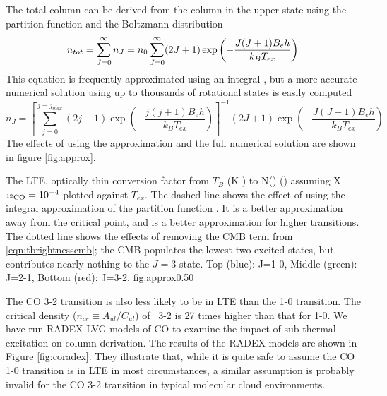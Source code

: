 The total column can be derived from the column in the upper state using the partition
function and the Boltzmann distribution
\begin{equation}
  n_{tot}  =        \sum_{J=0}^\infty n_J = n_0 \sum_{J=0}^\infty  (2J+1) \exp\left(-\frac{J(J+1) B_e h}{k_B T_{ex}}\right) \label{eqn:approxpartition}\\
\end{equation}
This equation is frequently approximated using an integral
\citep[e.g.][]{Cabrit1990}, but a more accurate numerical solution using up to
thousands of rotational states is easily computed
\begin{equation}
  n_J = \left[ \sum_{j=0}^{j=j_{max}} (2j+1) \exp\left(-\frac{j(j+1) B_e h}{k_B T_{ex}}\right) \right]^{-1} (2J+1) \exp\left(-\frac{J(J+1) B_e h}{k_B T_{ex}}\right)
\end{equation}
The effects of using the approximation and the full numerical solution are shown in figure \ref{fig:approx}.


{The LTE, optically thin conversion factor from $T_B$ (K \kms) to N(\hh)
(\persc) assuming X$_{^{12}\textrm{CO}}=10^{-4}$ plotted against $T_{ex}$.  The
dashed line shows the effect of using the integral approximation of the 
partition function \citep[e.g.][]{Cabrit1990}.  It is a better
approximation away from the critical point, and is a better approximation
for higher transitions.  The dotted line shows the effects of removing the 
CMB term from \eqref{eqn:tbrightnesscmb}; the CMB populates the lowest two
excited states, but contributes nearly nothing to the $J=3$ state. Top (blue):
J=1-0, Middle (green): J=2-1, Bottom (red): J=3-2.}
{fig:approx}{0.5}{0}


The CO 3-2 transition is also less likely to be in LTE than the 1-0 transition.
The critical density ($n_{cr}\equiv A_{ul}/C_{ul}$) of \twelveco\ 3-2 is 27
times higher than that for 1-0.  We have run RADEX \citep{VanDerTak2007} LVG
models of CO to examine the impact of sub-thermal excitation on column
derivation.  The results of the RADEX models are shown in Figure
\ref{fig:coradex}.  They illustrate that, while it is quite safe to assume the
CO 1-0 transition is in LTE in most circumstances, a similar assumption is
probably invalid for the CO 3-2 transition in typical molecular cloud
environments.

